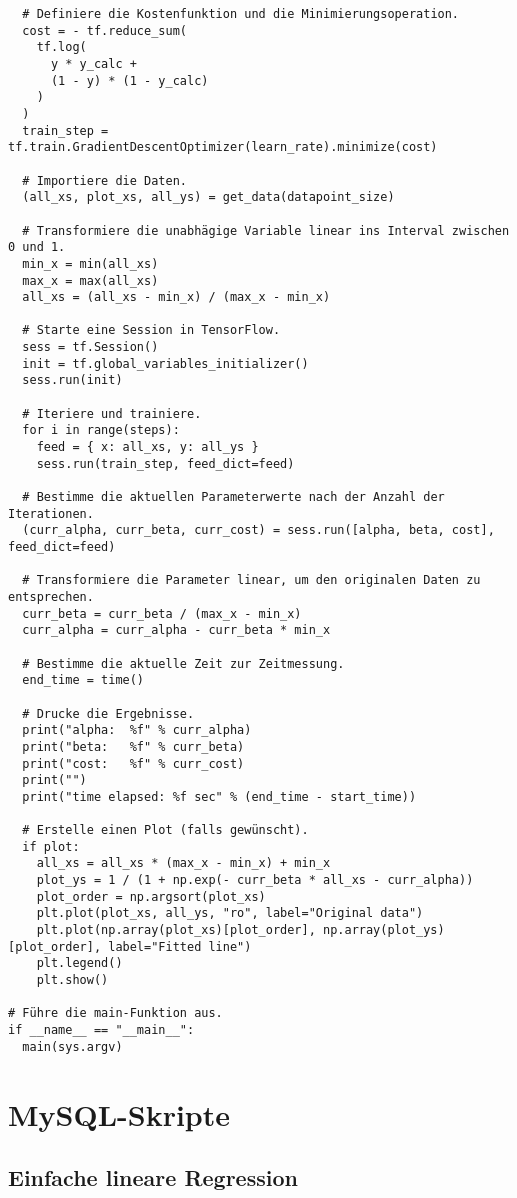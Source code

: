 \begin{verbatim}
  # Definiere die Kostenfunktion und die Minimierungsoperation.
  cost = - tf.reduce_sum(
    tf.log(
      y * y_calc +
      (1 - y) * (1 - y_calc)
    )
  )
  train_step = tf.train.GradientDescentOptimizer(learn_rate).minimize(cost)

  # Importiere die Daten.
  (all_xs, plot_xs, all_ys) = get_data(datapoint_size)

  # Transformiere die unabhägige Variable linear ins Interval zwischen 0 und 1.
  min_x = min(all_xs)
  max_x = max(all_xs)
  all_xs = (all_xs - min_x) / (max_x - min_x)

  # Starte eine Session in TensorFlow.
  sess = tf.Session()
  init = tf.global_variables_initializer()
  sess.run(init)

  # Iteriere und trainiere.
  for i in range(steps):
    feed = { x: all_xs, y: all_ys }
    sess.run(train_step, feed_dict=feed)

  # Bestimme die aktuellen Parameterwerte nach der Anzahl der Iterationen.
  (curr_alpha, curr_beta, curr_cost) = sess.run([alpha, beta, cost], feed_dict=feed)

  # Transformiere die Parameter linear, um den originalen Daten zu entsprechen.
  curr_beta = curr_beta / (max_x - min_x)
  curr_alpha = curr_alpha - curr_beta * min_x

  # Bestimme die aktuelle Zeit zur Zeitmessung.
  end_time = time()

  # Drucke die Ergebnisse.
  print("alpha:  %f" % curr_alpha)
  print("beta:   %f" % curr_beta)
  print("cost:   %f" % curr_cost)
  print("")
  print("time elapsed: %f sec" % (end_time - start_time))

  # Erstelle einen Plot (falls gewünscht).
  if plot:
    all_xs = all_xs * (max_x - min_x) + min_x
    plot_ys = 1 / (1 + np.exp(- curr_beta * all_xs - curr_alpha))
    plot_order = np.argsort(plot_xs)
    plt.plot(plot_xs, all_ys, "ro", label="Original data")
    plt.plot(np.array(plot_xs)[plot_order], np.array(plot_ys)[plot_order], label="Fitted line")
    plt.legend()
    plt.show()

# Führe die main-Funktion aus.
if __name__ == "__main__":
  main(sys.argv)
\end{verbatim}

\chapter{MySQL-Skripte}
\label{appendix:D}

\section{Einfache lineare Regression}
\label{appendix:D:1}

